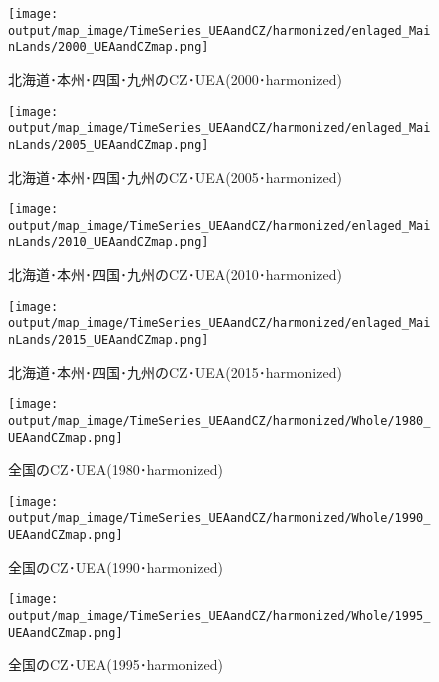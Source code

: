 \documentclass{ltjsarticle}
\begin{document}
  \begin{figure}[pbth]
    \centering
    \texttt{[image: output/map\_image/TimeSeries\_UEAandCZ/harmonized/enlaged\_MainLands/2000\_UEAandCZmap.png]}
    \caption{\label{ham:tsM2000}北海道･本州･四国･九州のCZ･UEA(2000･harmonized)}
  \end{figure}
  
  \begin{figure}[pbth]
    \centering
    \texttt{[image: output/map\_image/TimeSeries\_UEAandCZ/harmonized/enlaged\_MainLands/2005\_UEAandCZmap.png]}
    \caption{\label{ham:tsM2005}北海道･本州･四国･九州のCZ･UEA(2005･harmonized)}
  \end{figure}
  
  \begin{figure}[pbth]
    \centering
    \texttt{[image: output/map\_image/TimeSeries\_UEAandCZ/harmonized/enlaged\_MainLands/2010\_UEAandCZmap.png]}
    \caption{\label{ham:tsM2010}北海道･本州･四国･九州のCZ･UEA(2010･harmonized)}
  \end{figure}
  
  \begin{figure}[pbth]
    \centering
    \texttt{[image: output/map\_image/TimeSeries\_UEAandCZ/harmonized/enlaged\_MainLands/2015\_UEAandCZmap.png]}
    \caption{\label{ham:tsM2015}北海道･本州･四国･九州のCZ･UEA(2015･harmonized)}
  \end{figure}
  
  \begin{figure}[pbth]
    \centering
    \texttt{[image: output/map\_image/TimeSeries\_UEAandCZ/harmonized/Whole/1980\_UEAandCZmap.png]}
    \caption{\label{ham:tsA1980}全国のCZ･UEA(1980･harmonized)}
  \end{figure}
  
  \begin{figure}[pbth]
    \centering
    \texttt{[image: output/map\_image/TimeSeries\_UEAandCZ/harmonized/Whole/1990\_UEAandCZmap.png]}
    \caption{\label{ham:tsA1990}全国のCZ･UEA(1990･harmonized)}
  \end{figure}
  
  \begin{figure}[pbth]
    \centering
    \texttt{[image: output/map\_image/TimeSeries\_UEAandCZ/harmonized/Whole/1995\_UEAandCZmap.png]}
    \caption{\label{ham:tsA1995}全国のCZ･UEA(1995･harmonized)}
  \end{figure}
  
\end{document}

